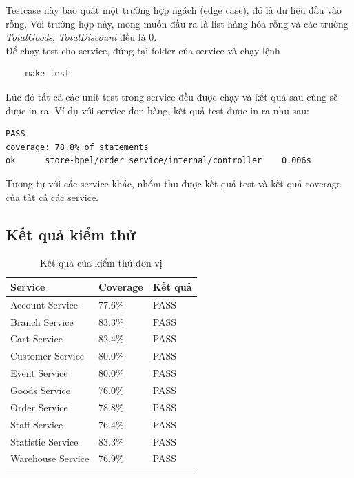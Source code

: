 Testcase này bao quát một trường hợp ngách (edge case), đó là dữ liệu đầu vào rỗng. Với trường hợp này, mong muốn đầu ra là list hàng hóa rỗng và các trường \emph{TotalGoods}, \emph{TotalDiscount} đều là 0.\\

Để chạy test cho service, đứng tại folder của service và chạy lệnh
\begin{lstlisting}
    make test
\end{lstlisting}

Lúc đó tất cả các unit test trong service đều được chạy và kết quả sau cùng sẽ được in ra. Ví dụ với service đơn hàng, kết quả test được in ra như sau:
\begin{lstlisting}
PASS
coverage: 78.8% of statements
ok      store-bpel/order_service/internal/controller    0.006s
\end{lstlisting}

Tương tự với các service khác, nhóm thu được kết quả test và kết quả coverage của tất cả các service.

\subsection{Kết quả kiểm thử}
 {
  \setlength\extrarowheight{6pt}
  \begin{longtable}{| p{4cm}| p{4cm}| p{4cm} |}
      \hline
      \textbf{Service}  & \textbf{Coverage} & \textbf{Kết quả} \\
      \hline
      Account Service   &  77.6\%      & PASS           \\
      \hline
      Branch Service    & 83.3\%      & PASS            \\
      \hline
      Cart Service      & 82.4\%      & PASS            \\
      \hline
      Customer Service  & 80.0\%     & PASS              \\
      \hline
      Event Service     & 80.0\%      & PASS             \\
      \hline
      Goods Service     & 76.0\%      & PASS             \\
      \hline
      Order Service     & 78.8\%     & PASS              \\
      \hline
      Staff Service     & 76.4\%     & PASS              \\
      \hline
      Statistic Service & 83.3\%     & PASS              \\
      \hline
      Warehouse Service & 76.9\%     & PASS              \\
      \hline
      \caption{Kết quả của kiểm thử đơn vị}
  \end{longtable}
 }

